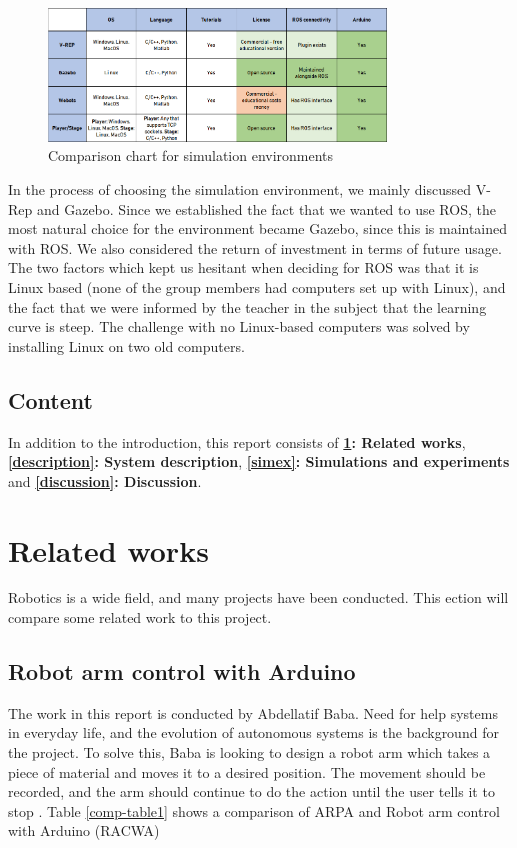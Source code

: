\documentclass[11pt,a4paper, titlepage]{article}
\begin{document}
\begin{figure}[H]
\centering
\includegraphics[width=0.8\textwidth]{../Diagrams/ComparisonSim}
\caption{Comparison chart for simulation environments}
\label{fig:compare}
\end{figure}

In the process of choosing the simulation environment, we mainly discussed V-Rep and Gazebo. Since we established the fact that we wanted to use ROS, the most natural choice for the environment became Gazebo, since this is maintained with ROS. We also considered the return of investment in terms of future usage. The two factors which kept us hesitant when deciding for ROS was that it is Linux based (none of the group members had computers set up with Linux), and the fact that we were informed by the teacher in the subject that the learning curve is steep. The challenge with no Linux-based computers was solved by installing Linux on two old computers. 

\subsection{Content}
In addition to the introduction, this report consists of \textbf{\ref{relwork}: Related works}, \textbf{\ref{description}: System description}, \textbf{\ref{simex}: Simulations and experiments} and \textbf{\ref{discussion}: Discussion}.

\newpage
\section{Related works}
\label{relwork}
Robotics is a wide field, and many projects have been conducted. This ection will compare some related work to this project.

\subsection{Robot arm control with Arduino}
The work in this report is conducted by Abdellatif Baba. Need for help systems in everyday life, and the evolution of autonomous systems is the background for the project. To solve this, Baba is looking to design a robot arm which takes a piece of material and moves it to a desired position. The movement should be recorded, and the arm should continue to do the action until the user tells it to stop \cite{baba2017}. Table \ref{comp-table1} shows a comparison of ARPA and Robot arm control with Arduino (RACWA)
\end{document}
